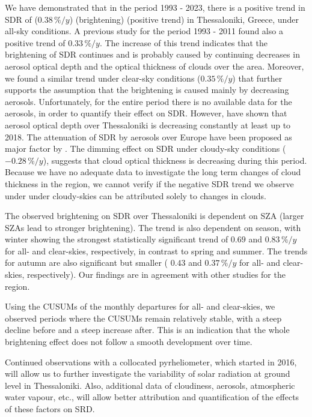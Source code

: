 \documentclass[applsci,article,submit,moreauthors,pdftex]{Definitions/mdpi}
\begin{document}
We have demonstrated that in the period 1993 - 2023, there is a positive
trend in SDR of (\(0.38\,\%/y\)) (brightening) (positive trend) in
Thessaloniki, Greece, under all-sky conditions. A previous study
\citep{Bais2013} for the period 1993 - 2011 found also a positive trend
of \(0.33\,\%/y\). The increase of this trend indicates that the
brightening of SDR continues and is probably caused by continuing
decreases in aerosol optical depth and the optical thickness of clouds
over the area. Moreover, we found a similar trend under clear-sky
conditions (\(0.35\,\%/y\)) that further supports the assumption that
the brightening is caused mainly by decreasing aerosols. Unfortunately,
for the entire period there is no available data for the aerosols, in
order to quantify their effect on SDR. However, \citet{Siomos2020} have
shown that aerosol optical depth over Thessaloniki is decreasing
constantly at least up to 2018. The attenuation of SDR by aerosols over
Europe have been proposed as major factor by \citet{Wild2021}. The
dimming effect on SDR under cloudy-sky conditions (\(-0.28\,\%/y\)),
suggests that cloud optical thickness is decreasing during this period.
Because we have no adequate data to investigate the long term changes of
cloud thickness in the region, we cannot verify if the negative SDR
trend we observe under under cloudy-skies can be attributed solely to
changes in clouds.

The observed brightening on SDR over Thessaloniki is dependent on SZA
(larger SZAs lead to stronger brightening). The trend is also dependent
on season, with winter showing the strongest statistically significant
trend of \(0.69\) and \(0.83\,\%/y\) for all- and clear-skies,
respectively, in contrast to spring and summer. The trends for autumn
are also significant but smaller ( \(0.43\) and \(0.37\,\%/y\) for all-
and clear-skies, respectively). Our findings are in agreement with other
studies for the region.

Using the CUSUMs of the monthly departures for all- and clear-skies, we
observed periods where the CUSUMs remain relatively stable, with a steep
decline before and a steep increase after. This is an indication that
the whole brightening effect does not follow a smooth development over
time.

Continued observations with a collocated pyrheliometer, which started in
2016, will allow us to further investigate the variability of solar
radiation at ground level in Thessaloniki. Also, additional data of
cloudiness, aerosols, atmospheric water vapour, etc., will allow better
attribution and quantification of the effects of these factors on SRD.
\end{document}
